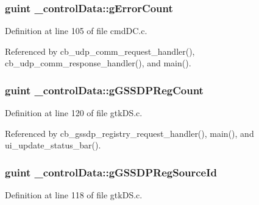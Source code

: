 \subsubsection[{\texorpdfstring{g\+Error\+Count}{gErrorCount}}]{\setlength{\rightskip}{0pt plus 5cm}guint \+\_\+control\+Data\+::g\+Error\+Count}\hypertarget{struct__control_data_a0dcc9f369186f6cf7c99b2178be66e58}{}\label{struct__control_data_a0dcc9f369186f6cf7c99b2178be66e58}


Definition at line 105 of file cmd\+D\+C.\+c.



Referenced by cb\+\_\+udp\+\_\+comm\+\_\+request\+\_\+handler(), cb\+\_\+udp\+\_\+comm\+\_\+response\+\_\+handler(), and main().

\subsubsection[{\texorpdfstring{g\+G\+S\+S\+D\+P\+Reg\+Count}{gGSSDPRegCount}}]{\setlength{\rightskip}{0pt plus 5cm}guint \+\_\+control\+Data\+::g\+G\+S\+S\+D\+P\+Reg\+Count}\hypertarget{struct__control_data_a841eb51dde0376a7540a23e65933e822}{}\label{struct__control_data_a841eb51dde0376a7540a23e65933e822}


Definition at line 120 of file gtk\+D\+S.\+c.



Referenced by cb\+\_\+gssdp\+\_\+registry\+\_\+request\+\_\+handler(), main(), and ui\+\_\+update\+\_\+status\+\_\+bar().

\subsubsection[{\texorpdfstring{g\+G\+S\+S\+D\+P\+Reg\+Source\+Id}{gGSSDPRegSourceId}}]{\setlength{\rightskip}{0pt plus 5cm}guint \+\_\+control\+Data\+::g\+G\+S\+S\+D\+P\+Reg\+Source\+Id}\hypertarget{struct__control_data_a4132cf34364874408e8b15be539e654d}{}\label{struct__control_data_a4132cf34364874408e8b15be539e654d}


Definition at line 118 of file gtk\+D\+S.\+c.



